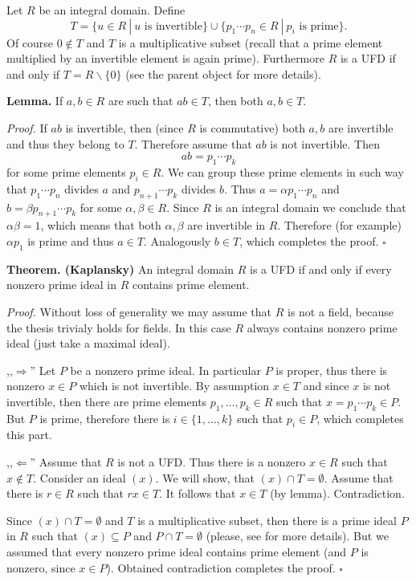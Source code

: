 \documentclass[12pt]{article}
\begin{document}
Let $R$ be an integral domain. Define 
$$T=\{u\in R\ |\ u\mbox{ is invertible}\}\cup\{p_1\cdots p_n\in R\ |\ p_i\mbox{ is prime}\}.$$
Of course $0\not\in T$ and $T$ is a multiplicative subset (recall that a prime element multiplied by an invertible element is again prime). Furthermore $R$ is a UFD if and only if $T=R\backslash\{0\}$ (see the parent object for more details).

\textbf{Lemma.} If $a,b\in R$ are such that $ab\in T$, then both $a,b\in T$.

\textit{Proof.} If $ab$ is invertible, then (since $R$ is commutative) both $a,b$ are invertible and thus they belong to $T$. Therefore assume that $ab$ is not invertible. Then
$$ab=p_1\cdots p_k$$
for some prime elements $p_i\in R$. We can group these prime elements in such way that $p_1\cdots p_n$ divides $a$ and $p_{n+1}\cdots p_k$ divides $b$. Thus $a=\alpha p_1\cdots p_n$ and $b=\beta p_{n+1}\cdots p_k$ for some $\alpha,\beta\in R$. Since $R$ is an integral domain we conclude that $\alpha\beta=1$, which means that both $\alpha,\beta$ are invertible in $R$. Therefore (for example) $\alpha p_1$ is prime and thus $a\in T$. Analogously $b\in T$, which completes the proof. $\square$

\textbf{Theorem. (Kaplansky)} An integral domain $R$ is a UFD if and only if every nonzero prime ideal in $R$ contains prime element.

\textit{Proof.} Without loss of generality we may assume that $R$ is not a field, because the thesis trivialy holds for fields. In this case $R$ always contains nonzero prime ideal (just take a maximal ideal).

,,$\Rightarrow$'' Let $P$ be a nonzero prime ideal. In particular $P$ is proper, thus there is nonzero $x\in P$ which is not invertible. By assumption $x\in T$ and since $x$ is not invertible, then there are prime elements $p_1,\ldots, p_k\in R$ such that $x=p_1\cdots p_k\in P$. But $P$ is prime, therefore there is $i\in\{1,\ldots, k\}$ such that $p_i\in P$, which completes this part.

,,$\Leftarrow$'' Assume that $R$ is not a UFD. Thus there is a nonzero $x\in R$ such that $x\not\in T$. Consider an ideal $(x)$. We will show, that $(x)\cap T=\emptyset$. Assume that there is $r\in R$ such that $rx\in T$. It follows that $x\in T$ (by lemma). Contradiction.

Since $(x)\cap T=\emptyset$ and $T$ is a multiplicative subset, then there is a prime ideal $P$ in $R$ such that $(x)\subseteq P$ and $P\cap T=\emptyset$ (please, see  for more details). But we assumed that every nonzero prime ideal contains prime element (and $P$ is nonzero, since $x\in P$). Obtained contradiction completes the proof. $\square$
\end{document}
